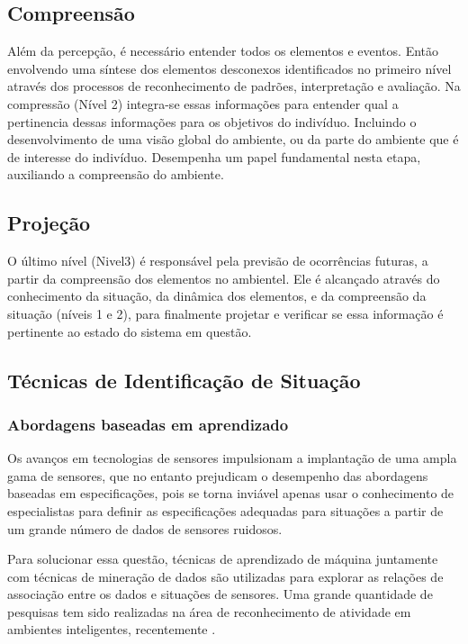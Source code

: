 \documentclass[12pt,a4paper,compsoc]{IEEEtran}
\begin{document}
\subsection{Compreensão}

  Além da percepção, é necessário entender todos os elementos e eventos. Então envolvendo uma 
  síntese dos elementos desconexos identificados no primeiro nível através dos processos de 
  reconhecimento de padrões, interpretação e avaliação. Na compressão (Nível 2) integra-se essas
  informações para entender qual a pertinencia dessas informações para os objetivos do indivíduo.
  Incluindo o desenvolvimento de uma visão global do ambiente, ou da parte do ambiente que é de 
  interesse do indivíduo. Desempenha um papel fundamental nesta etapa, auxiliando a compreensão do
  ambiente.


\subsection{Projeção}

  O último nível (Nivel3)  é responsável pela previsão de ocorrências futuras, a partir da 
  compreensão dos elementos no ambientel. Ele é alcançado através do conhecimento da situação, da
  dinâmica dos elementos, e da compreensão da situação (níveis 1 e 2), para finalmente projetar e
  verificar se essa informação é pertinente ao estado do sistema em questão.


\subsection{Técnicas de Identificação de Situação}


\subsubsection{Abordagens baseadas em aprendizado}

  Os avanços em tecnologias de sensores impulsionam a implantação de uma ampla gama de sensores,
  que no entanto prejudicam o desempenho das abordagens baseadas em especificações, pois se torna
  inviável apenas usar o conhecimento de especialistas para definir as especificações adequadas
  para situações a partir de um grande número de dados de sensores ruidosos.
  
  Para solucionar essa questão, técnicas de aprendizado de máquina juntamente com técnicas de
  mineração de dados são utilizadas para explorar as relações de associação entre os dados e 
  situações de sensores. Uma grande quantidade de pesquisas tem sido realizadas na área de
  reconhecimento de atividade em ambientes inteligentes, recentemente \cite{knappmeyer2012survey}.
  
\end{document}
